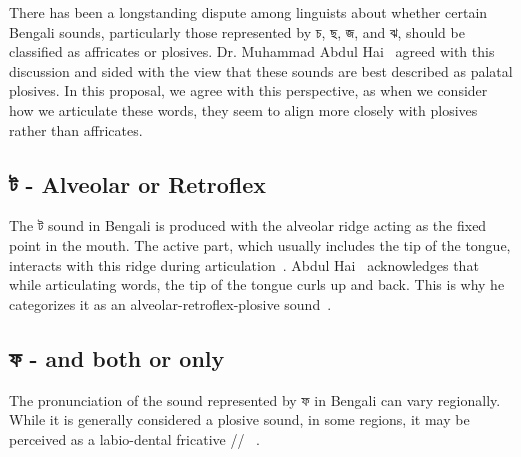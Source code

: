 There has been a longstanding dispute among linguists about whether certain Bengali sounds, particularly those represented by \textbengali{চ, ছ, জ, and ঝ}, should be classified as affricates or plosives. Dr. Muhammad Abdul Hai~\cite{hai1964dhwonibijnan} agreed with this discussion and sided with the view that these sounds are best described as palatal plosives. In this proposal, we agree with this perspective, as when we consider how we articulate these words, they seem to align more closely with plosives rather than affricates.

\subsection{\textbengali{ট} - Alveolar or Retroflex}

\begin{table}[!ht]
    \centering
    \caption{Phonetic Transcription of Consonants}
\end{table}

The \textbengali{ট} sound in Bengali is produced with the alveolar ridge acting as the fixed point in the mouth. The active part, which usually includes the tip of the tongue, interacts with this ridge during articulation~\cite{hai1964dhwonibijnan}. Abdul Hai~\cite{hai1964dhwonibijnan} acknowledges that while articulating words, the tip of the tongue curls up and back. This is why he categorizes it as an alveolar-retroflex-plosive sound~\cite{hai1964dhwonibijnan}.

\subsection{\textbengali{ফ} -  and  both or only }

The pronunciation of the sound represented by \textbengali{ফ} in Bengali can vary regionally. While it is generally considered a plosive sound, in some regions, it may be perceived as a labio-dental fricative // ~\cite{hai1964dhwonibijnan}. 

